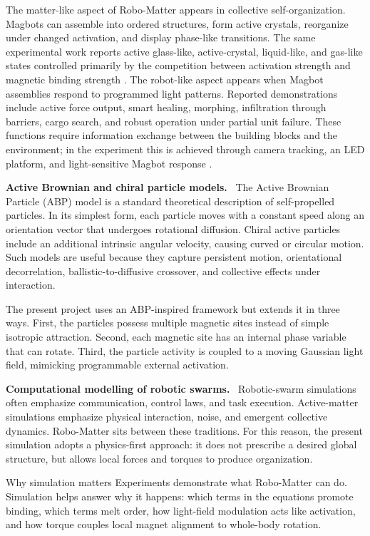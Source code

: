 \documentclass[12pt,a4paper,oneside]{report}
\newcommand{\runin}[1]{\vspace{0.45em}\noindent\textbf{#1.}\ }
\begin{document}
The matter-like aspect of Robo-Matter appears in collective self-organization. Magbots can assemble into ordered structures, form active crystals, reorganize under changed activation, and display phase-like transitions. The same experimental work reports active glass-like, active-crystal, liquid-like, and gas-like states controlled primarily by the competition between activation strength and magnetic binding strength \cite{wang2024robomatter}. The robot-like aspect appears when Magbot assemblies respond to programmed light patterns. Reported demonstrations include active force output, smart healing, morphing, infiltration through barriers, cargo search, and robust operation under partial unit failure. These functions require information exchange between the building blocks and the environment; in the experiment this is achieved through camera tracking, an LED platform, and light-sensitive Magbot response \cite{wang2024robomatter}.

\runin{Active Brownian and chiral particle models}
The Active Brownian Particle (ABP) model is a standard theoretical description of self-propelled particles. In its simplest form, each particle moves with a constant speed along an orientation vector that undergoes rotational diffusion. Chiral active particles include an additional intrinsic angular velocity, causing curved or circular motion. Such models are useful because they capture persistent motion, orientational decorrelation, ballistic-to-diffusive crossover, and collective effects under interaction.

The present project uses an ABP-inspired framework but extends it in three ways. First, the particles possess multiple magnetic sites instead of simple isotropic attraction. Second, each magnetic site has an internal phase variable that can rotate. Third, the particle activity is coupled to a moving Gaussian light field, mimicking programmable external activation.

\runin{Computational modelling of robotic swarms}
Robotic-swarm simulations often emphasize communication, control laws, and task execution. Active-matter simulations emphasize physical interaction, noise, and emergent collective dynamics. Robo-Matter sits between these traditions. For this reason, the present simulation adopts a physics-first approach: it does not prescribe a desired global structure, but allows local forces and torques to produce organization.

\begin{notebox}{Why simulation matters}
Experiments demonstrate what Robo-Matter can do. Simulation helps answer why it happens: which terms in the equations promote binding, which terms melt order, how light-field modulation acts like activation, and how torque couples local magnet alignment to whole-body rotation.
\end{notebox}
\end{document}
